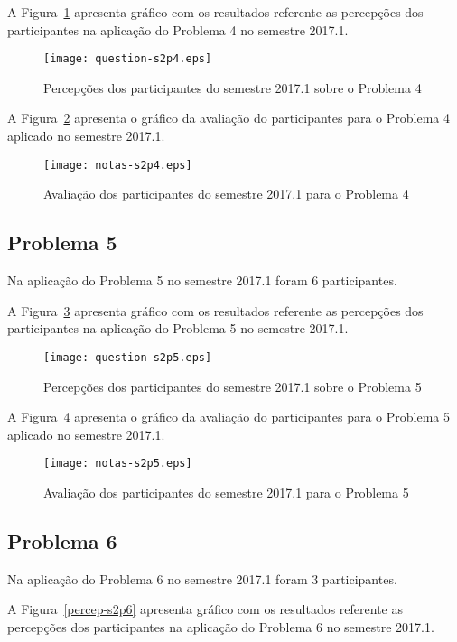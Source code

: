 A Figura~\ref{percep-s2p4} apresenta gráfico com os resultados referente
as percepções dos participantes na aplicação do
Problema 4 no semestre 2017.1.

\begin{figure}[!htb]
\centering
\texttt{[image: question-s2p4.eps]}
\caption{Percepções dos participantes do semestre 2017.1 sobre o Problema 4}
\label{percep-s2p4}
\end{figure}

A Figura~\ref{aval-s2p4} apresenta o gráfico da
avaliação do participantes para o Problema 4 aplicado no semestre 2017.1.

\begin{figure}[!htb]
\centering
\texttt{[image: notas-s2p4.eps]}
\caption{Avaliação dos participantes do semestre 2017.1 para o Problema 4}
\label{aval-s2p4}
\end{figure}

\subsection{Problema 5}
Na aplicação do Problema 5 no semestre 2017.1 foram 6 participantes.

A Figura~\ref{percep-s2p5} apresenta gráfico com os resultados referente
as percepções dos participantes na aplicação do
Problema 5 no semestre 2017.1.

\begin{figure}[!htb]
\centering
\texttt{[image: question-s2p5.eps]}
\caption{Percepções dos participantes do semestre 2017.1 sobre o Problema 5}
\label{percep-s2p5}
\end{figure}

A Figura~\ref{aval-s2p5} apresenta o gráfico da
avaliação do participantes para o Problema 5 aplicado no semestre 2017.1.

\begin{figure}[!htb]
\centering
\texttt{[image: notas-s2p5.eps]}
\caption{Avaliação dos participantes do semestre 2017.1 para o Problema 5}
\label{aval-s2p5}
\end{figure}

\subsection{Problema 6}
Na aplicação do Problema 6 no semestre 2017.1 foram 3 participantes.

A Figura~\ref{percep-s2p6} apresenta gráfico com os resultados referente
as percepções dos participantes na aplicação do
Problema 6 no semestre 2017.1.

